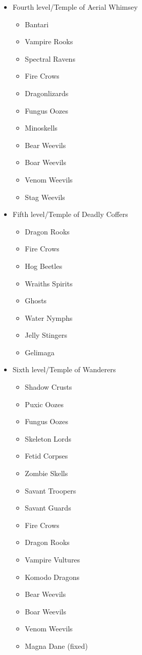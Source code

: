 \documentclass[12pt]{article}
\providecommand{\tightlist}{%
  \setlength{\itemsep}{0pt}\setlength{\parskip}{0pt}}
\begin{document}
\begin{multicols}{2}
\begin{itemize}
    \item Fourth level/Temple of Aerial Whimsey
      \begin{itemize}
        \tightlist
      \item Bantari
      \item Vampire Rooks
      \item Spectral Ravens
      \item Fire Crows
      \item Dragonlizards
      \item Fungus Oozes
      \item Minoskells
      \item Bear Weevils
      \item Boar Weevils
      \item Venom Weevils
      \item Stag Weevils
      \end{itemize}

    \item Fifth level/Temple of Deadly Coffers
      \begin{itemize}
        \tightlist
      \item Dragon Rooks
      \item Fire Crows
      \item Hog Beetles
      \item Wraiths Spirits
      \item Ghosts
      \item Water Nymphs
      \item Jelly Stingers
      \item Gelimaga
      \end{itemize}

    \item Sixth level/Temple of Wanderers
      \begin{itemize}
        \tightlist
      \item Shadow Crusts
        \item Puxic Oozes
        \item Fungus Oozes
        \item Skeleton Lords
        \item Fetid Corpses
        \item Zombie Skells
        \item Savant Troopers
        \item Savant Guards
        \item Fire Crows
        \item Dragon Rooks
        \item Vampire Vultures
        \item Komodo Dragons
        \item Bear Weevils
        \item Boar Weevils
        \item Venom Weevils
        \item Magna Dane (fixed)
      \end{itemize}


\end{itemize}
\end{multicols}
\end{document}
